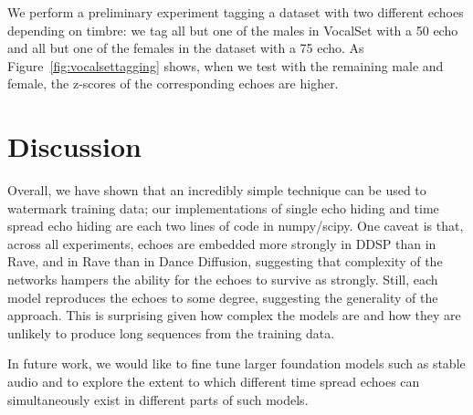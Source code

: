 \documentclass[letterpaper]{article} %
\begin{document}
We perform a preliminary experiment tagging a dataset with two different echoes depending on timbre: we tag all but one of the males in VocalSet with a 50 echo and all but one of the females in the dataset with a 75 echo.  As Figure~\ref{fig:vocalsettagging} shows, when we test with the remaining male and female, the z-scores of the corresponding echoes are higher.

\section{Discussion}
Overall, we have shown that an incredibly simple technique can be used to watermark training data; our implementations of single echo hiding and time spread echo hiding are each two lines of code in numpy/scipy.  One caveat is that, across all experiments, echoes are embedded more strongly in DDSP than in Rave, and in Rave than in Dance Diffusion, suggesting that complexity of the networks hampers the ability for the echoes to survive as strongly.  Still, each model reproduces the echoes to some degree, suggesting the generality of the approach.  This is surprising given how complex the models are and how they are unlikely to produce long sequences from the training data.

In future work, we would like to fine tune larger foundation models such as stable audio \cite{evans2024long} and to explore the extent to which different time spread echoes can simultaneously exist in different parts of such models.


\end{document}

